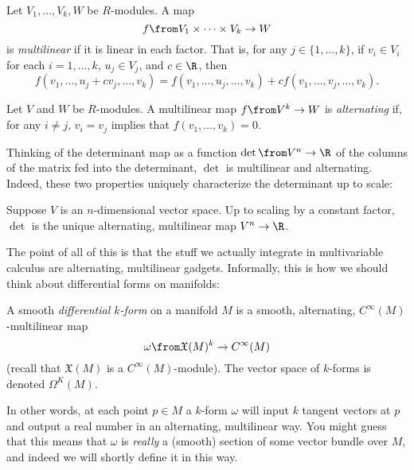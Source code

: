 \begin{definition}\label{def:multilinear}
	Let $V_1, \dots , V_k, W$ be $R$-modules. A map
	\[
		f \from V_1 \times \dots \times V_k \to W
	\]
	is \emph{multilinear} if it is linear in each factor. That is, for any $j \in \{1, \dots , k\}$, if $v_i \in V_i$ for each $i=1, \dots , k$, $u_j \in V_j$, and $c \in \R$, then
	\[
		f(v_1, \dots , u_j + c v_j , \dots , v_k) = f(v_1, \dots , u_j, \dots , v_k) + c f(v_1, \dots , v_j, \dots , v_k).
	\]
\end{definition}

\begin{definition}\label{def:alternating}
	Let $V$ and $W$ be $R$-modules. A multilinear map $f\from V^k \to W$ is \emph{alternating} if, for any $i \neq j$, $v_i = v_j$ implies that $f(v_1, \dots , v_k) = 0$.
\end{definition}

Thinking of the determinant map as a function $\det\from V^n \to \R$ of the columns of the matrix fed into the determinant, $\det$ is multilinear and alternating. Indeed, these two properties uniquely characterize the determinant up to scale:

\begin{theorem}\label{thm:determinant}
	Suppose $V$ is an $n$-dimensional vector space. Up to scaling by a constant factor, $\det$ is the unique alternating, multilinear map $V^n \to \R$. 
\end{theorem}

The point of all of this is that the stuff we actually integrate in multivariable calculus are alternating, multilinear gadgets. Informally, this is how we should think about differential forms on manifolds:

\begin{definition}\label{def:informal differential form}
	A smooth \emph{differential $k$-form} on a manifold $M$ is a smooth, alternating, $C^\infty(M)$-multilinear map
	\[
		\omega \from \mathfrak{X}(M)^k \to C^\infty(M)
	\]
	(recall that $\mathfrak{X}(M)$ is a $C^\infty(M)$-module). The vector space of $k$-forms is denoted $\Omega^K(M)$.
\end{definition}

In other words, at each point $p \in M$ a $k$-form $\omega$ will input $k$ tangent vectors at $p$ and output a real number in an alternating, multilinear way. You might guess that this means that $\omega$ is \emph{really} a (smooth) section of some vector bundle over $M$, and indeed we will shortly define it in this way. 

